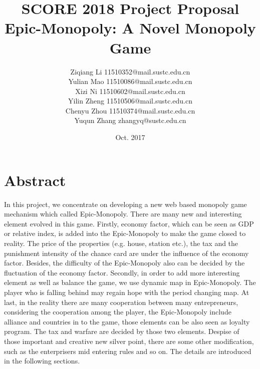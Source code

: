 \documentclass[a4paper,12pt]{article}
\begin{document}

\title{SCORE 2018 Project Proposal\\Epic-Monopoly: A Novel Monopoly Game}
\author{\small Ziqiang Li 11510352@mail.sustc.edu.cn\\
\small Yulian Mao 11510086@mail.sustc.edu.cn\\
\small Xizi Ni 11510602@mail.sustc.edu.cn\\
\small Yilin Zheng 11510506@mail.sustc.edu.cn\\
\small Chenyu Zhou 11510374@mail.sustc.edu.cn\\
\small Yuqun Zhang zhangyq@sustc.edu.cn}
\date{Oct. 2017}



\maketitle


\section{Abstract}
\lettrine[lines=2,loversize=0.35,lraise=0.07,findent=3pt,nindent=2pt]{I}{}n this project, we concentrate on developing a new web based monopoly game mechanism which called Epic-Monopoly. There are many new and interesting element evolved in this game. Firstly, economy factor, which can be seen as GDP or relative index, is added into the Epic-Monopoly to make the game closed to reality. The price of the properties (e.g. house, station etc.), the tax and the punishment intensity of the chance card are under the influence of the economy factor. Besides, the difficulty of the Epic-Monopoly also can be decided by the fluctuation of the economy factor. Secondly, in order to add more interesting element as well as balance the game, we use dynamic map in Epic-Monopoly. The player who is falling behind may regain hope with the period changing map. At last, in the reality there are many cooperation between many entrepreneurs, considering the cooperation among the player, the Epic-Monopoly include alliance and countries in to the game, those elements can be also seen as loyalty program. The tax and warfare are decided by those two elements. Despise of those important and creative new silver point, there are some other modification, such as the enterprisers mid entering rules and so on. The details are introduced in the following sections.
\end{document}
